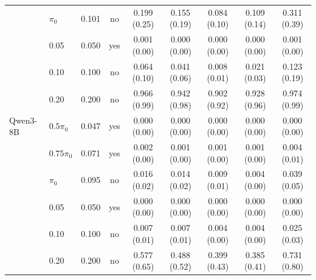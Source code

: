 \begin{table}[H]
\begin{tabular}{llrc ccccc}
 & $\pi_0$ & 0.101 & no & 0.199 (0.25) & 0.155 (0.19) & 0.084 (0.10) & 0.109 (0.14) & 0.311 (0.39) \\
 & 0.05 & 0.050 & yes & 0.001 (0.00) & 0.000 (0.00) & 0.000 (0.00) & 0.000 (0.00) & 0.001 (0.00) \\
 & 0.10 & 0.100 & no & 0.064 (0.10) & 0.041 (0.06) & 0.008 (0.01) & 0.021 (0.03) & 0.123 (0.19) \\
 & 0.20 & 0.200 & no & 0.966 (0.99) & 0.942 (0.98) & 0.902 (0.92) & 0.928 (0.96) & 0.974 (0.99) \\
\addlinespace
Qwen3-8B & $0.5\pi_0$ & 0.047 & yes & 0.000 (0.00) & 0.000 (0.00) & 0.000 (0.00) & 0.000 (0.00) & 0.000 (0.00) \\
 & $0.75\pi_0$ & 0.071 & yes & 0.002 (0.00) & 0.001 (0.00) & 0.001 (0.00) & 0.001 (0.00) & 0.004 (0.01) \\
 & $\pi_0$ & 0.095 & no & 0.016 (0.02) & 0.014 (0.02) & 0.009 (0.01) & 0.004 (0.00) & 0.039 (0.05) \\
 & 0.05 & 0.050 & yes & 0.000 (0.00) & 0.000 (0.00) & 0.000 (0.00) & 0.000 (0.00) & 0.000 (0.00) \\
 & 0.10 & 0.100 & no & 0.007 (0.01) & 0.007 (0.01) & 0.004 (0.00) & 0.004 (0.00) & 0.025 (0.03) \\
 & 0.20 & 0.200 & no & 0.577 (0.65) & 0.488 (0.52) & 0.399 (0.43) & 0.385 (0.41) & 0.731 (0.80) \\
\bottomrule
\end{tabular}
\end{table}
